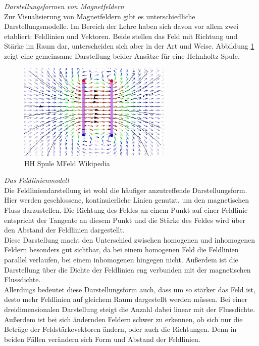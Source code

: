 \vspace{4px}
\textit{Darstellungsformen von Magnetfeldern}\\
Zur Visualisierung von Magnetfeldern gibt es unterschiedliche Darstellungsmodelle. Im Bereich der Lehre haben sich davon vor allem zwei etabliert: Feldlinien und Vektoren. Beide stellen das Feld mit Richtung und Stärke im Raum dar, unterscheiden sich aber in der Art und Weise. Abbildung \ref{img:Magnetfeld-Helmholtzspule} zeigt eine gemeinsame Darstellung beider Ansätze für eine Helmholtz-Spule.\\

\begin{figure}[h!]
	\centering
	\includegraphics[width=0.65\textwidth]{images/Magnetfeld-Helmholtzspule.jpg}
	\caption{HH Spule MFeld Wikipedia}
	\label{img:Magnetfeld-Helmholtzspule}
\end{figure}

\textit{Das Feldlinienmodell}\\
Die Feldliniendarstellung ist wohl die häufiger anzutreffende Darstellungsform. Hier werden geschlossene, kontinuierliche Linien genutzt, um den magnetischen Fluss darzustellen. Die Richtung des Feldes an einem Punkt auf einer Feldlinie entspricht der Tangente an diesem Punkt und die Stärke des Feldes wird über den Abstand der Feldlinien dargestellt.\\

Diese Darstellung macht den Unterschied zwischen homogenen und inhomogenen Feldern besonders gut sichtbar, da bei einem homogenen Feld die Feldlinien parallel verlaufen, bei einem inhomogenen hingegen nicht. Außerdem ist die Darstellung über die Dichte der Feldlinien eng verbunden mit der magnetischen Flussdichte.\\
Allerdings bedeutet diese Darstellungsform auch, dass um so stärker das Feld ist, desto mehr Feldlinien auf gleichem Raum dargestellt werden müssen. Bei einer dreidimensionalen Darstellung steigt die Anzahl dabei linear mit der Flussdichte. Außerdem ist bei sich ändernden Feldern schwer zu erkennen, ob sich nur die Beträge der Feldstärkevektoren ändern, oder auch die Richtungen. Denn in beiden Fällen verändern sich Form und Abstand der Feldlinien.\\

